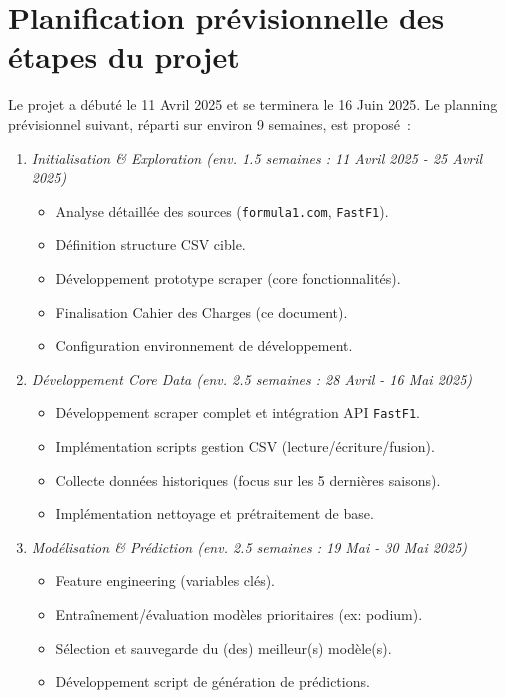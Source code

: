 \documentclass[11pt, a4paper]{article}
\newcommand{\startDate}{11 Avril 2025}
\newcommand{\endDate}{16 Juin 2025}
\begin{document}
\section{Planification prévisionnelle des étapes du projet}

Le projet a débuté le \startDate{} et se terminera le \endDate{}. Le planning prévisionnel suivant, réparti sur environ 9 semaines, est proposé~:

\begin{enumerate}[label=Phase \arabic*:, wide, labelwidth=!, labelindent=0pt, leftmargin=*, itemsep=0.5em, font=\normalfont] %
    \item \textit{Initialisation \& Exploration (env. 1.5 semaines : \startDate{} - 25 Avril 2025)}
        \begin{itemize}[label=\textendash, itemsep=0.2em, leftmargin=*]
            \item Analyse détaillée des sources (\texttt{formula1.com}, \texttt{FastF1}).
            \item Définition structure CSV cible.
            \item Développement prototype scraper (core fonctionnalités).
            \item Finalisation Cahier des Charges (ce document).
            \item Configuration environnement de développement.
        \end{itemize}

    \item \textit{Développement Core Data (env. 2.5 semaines : 28 Avril - 16 Mai 2025)}
        \begin{itemize}[label=\textendash, itemsep=0.2em, leftmargin=*]
            \item Développement scraper complet et intégration API \texttt{FastF1}.
            \item Implémentation scripts gestion CSV (lecture/écriture/fusion).
            \item Collecte données historiques (focus sur les 5 dernières saisons).
            \item Implémentation nettoyage et prétraitement de base.
        \end{itemize}

    \item \textit{Modélisation \& Prédiction (env. 2.5 semaines : 19 Mai - 30 Mai 2025)}
        \begin{itemize}[label=\textendash, itemsep=0.2em, leftmargin=*]
            \item Feature engineering (variables clés).
            \item Entraînement/évaluation modèles prioritaires (ex: podium).
            \item Sélection et sauvegarde du (des) meilleur(s) modèle(s).
            \item Développement script de génération de prédictions.
        \end{itemize}


\end{enumerate}
\end{document}
